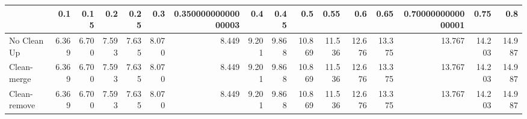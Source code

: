 \begin{tabular}{lrrrrrrrrrrrrrrr}
\toprule
{} &   0.1 &  0.15 &   0.2 &  0.25 &   0.3 & 0.35000000000000003 &   0.4 &  0.45 &    0.5 &   0.55 &    0.6 &   0.65 & 0.7000000000000001 &   0.75 &    0.8 \\
\midrule
No Clean Up  & 6.369 & 6.700 & 7.593 & 7.635 & 8.070 &               8.449 & 9.201 & 9.868 & 10.869 & 11.536 & 12.676 & 13.375 &             13.767 & 14.203 & 14.987 \\
Clean-merge  & 6.369 & 6.700 & 7.593 & 7.635 & 8.070 &               8.449 & 9.201 & 9.868 & 10.869 & 11.536 & 12.676 & 13.375 &             13.767 & 14.203 & 14.987 \\
Clean-remove & 6.369 & 6.700 & 7.593 & 7.635 & 8.070 &               8.449 & 9.201 & 9.868 & 10.869 & 11.536 & 12.676 & 13.375 &             13.767 & 14.203 & 14.987 \\
\bottomrule
\end{tabular}
